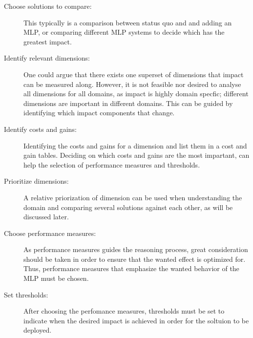 \documentclass{article}
\begin{document}
\begin{description}
\item [Choose solutions to compare:]
This typically is a comparison between status quo and and adding an MLP, or comparing different MLP systems to decide which has the greatest impact. 

\item [Identify relevant dimensions:] 
One could argue that there exists one superset of dimensions that impact can be measured along.
However, it is not feasible nor desired to analyse all dimensions for all domains, as impact is highly domain specfic; different dimensions are important in different domains.
This can be guided by identifying which impact components that change.

\item[Identify costs and gains:] 
Identifying the costs and gains for a dimension and list them in a cost and gain tables.
Deciding on which costs and gains are the most impartant, can help the selection of performance measures and thresholds.


\item[Prioritize dimensions:]
A relative priorization of dimension can be used when understanding the domain and comparing several solutions against each other, as will be discussed later.

\item[Choose performance measures:]
As performance measures guides the reasoning process, great consideration should be taken in order to ensure that the wanted effect is optimized for.
Thus, performance measures that emphasize the wanted behavior of the MLP must be chosen.

\item[Set thresholds:]
After choosing the perfomance measures, thresholds must be set to indicate when the desired impact is achieved in order for the soltuion to be deployed. 
\end{description}
\end{document}

